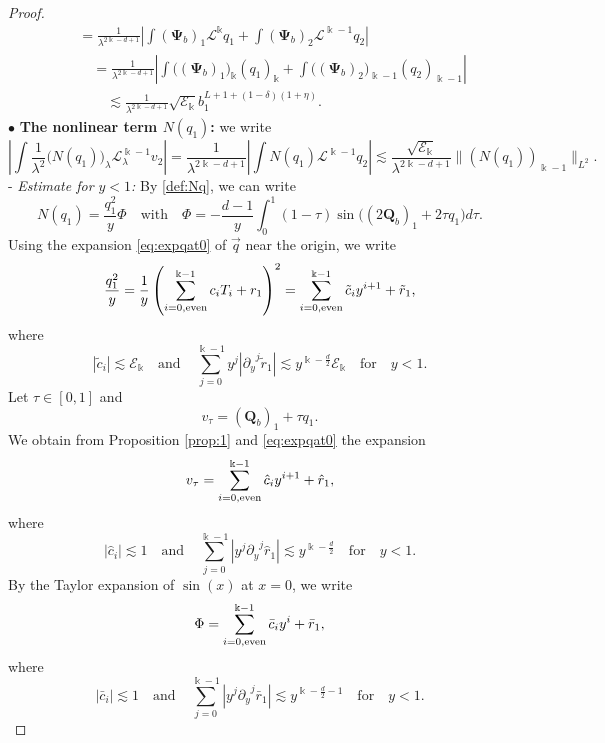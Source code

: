 \documentclass[11pt]{aims}
\theoremstyle{definition}
\numberwithin{equation}{section}
\begin{document}
\begin{proof}
\begin{align}
&\quad = \frac{1}{\lambda^{2\Bbbk - d + 1}}\left|\int(\mathbf{\Psi}_b)_1 {\mathscr{L}}^{\Bbbk}q_1 +\int(\mathbf{\Psi}_b)_2 {\mathscr{L}}^{\Bbbk - 1}q_2  \right|\nonumber\\
& \qquad = \frac{1}{\lambda^{2\Bbbk - d + 1}}\left|\int\big((\mathbf{\Psi}_b)_1\big)_{\Bbbk} (q_1)_\Bbbk +\int\big((\mathbf{\Psi}_b)_2\big)_{\Bbbk - 1} (q_2)_{\Bbbk - 1}\right|\nonumber\\
& \qquad \quad \lesssim \frac{1}{\lambda^{2\Bbbk - d + 1}}\sqrt{{\mathscr{E}}_\Bbbk}b_1^{L + 1 + (1 -\delta)(1 + \eta)}.\label{est:Psi}
\end{align}
$\bullet$ \textbf{The nonlinear term $N(q_1)$:} we write 
\begin{equation}\label{est:Nq1}
\left|\int \frac{1}{\lambda^2}\big(N(q_1)\big)_\lambda{\mathscr{L}}_\lambda^{\Bbbk - 1}v_2\right| = \frac{1}{\lambda^{2\Bbbk - d  +1}}\left|\int N(q_1){\mathscr{L}}^{\Bbbk - 1}q_2\right| \lesssim \frac{\sqrt{{\mathscr{E}}_\Bbbk}}{\lambda^{2\Bbbk -d + 1 }}\|(N(q_1))_{\Bbbk - 1} \|_{L^2}.
\end{equation}
- \textit{Estimate for $y < 1$:} By \eqref{def:Nq}, we can write
$$N(q_1) = \frac{q_1^2}{y}\Phi \quad \text{with} \quad \Phi = -\frac{d-1}{y}\int_0^1(1 - \tau)\sin\big((2\mathbf{Q}_b)_1 + 2\tau q_1\big) d\tau.$$
Using the expansion \eqref{eq:expqat0} of $\vec q$ near the origin, we write
\begin{equation}\label{eq:q1y2}
\frac{q_1^2}{y} = \frac{1}{y} \left(\sum_{i = 0, \textup{even}}^{\Bbbk - 1}c_iT_i + r_1\right)^2 = \sum_{i = 0, \textup{even}}^{\Bbbk - 1}\tilde c_iy^{i + 1} + \tilde r_1,
\end{equation}
where 
$$|\tilde{c}_i| \lesssim {\mathscr{E}}_\Bbbk \quad \text{and} \quad \sum_{j = 0}^{\Bbbk - 1}y^j|{\partial_y}^j \tilde{r}_1| \lesssim y^{\Bbbk - \frac{d}{2}}{\mathscr{E}}_\Bbbk \quad \text{for}\quad  y < 1.$$ 
Let $\tau \in [0,1]$ and 
$$v_\tau = (\mathbf{Q}_b)_1 + \tau q_1.$$
We obtain from Proposition \ref{prop:1} and \eqref{eq:expqat0} the expansion
$$v_\tau = \sum_{i = 0, \textup{even}}^{\Bbbk - 1} \hat c_i y^{i  +1} + \hat r_1,$$
where
$$|\hat c_i| \lesssim 1 \quad \text{and} \quad \sum_{j = 0}^{\Bbbk - 1}|y^j {\partial_y}^j \hat r_1| \lesssim y^{\Bbbk - \frac{d}{2}} \quad \text{for} \quad y < 1.$$
By the Taylor expansion of $\sin(x)$ at $x = 0$, we write
\begin{equation}\label{eq:Phiq}
\Phi = \sum_{i = 0, \textup{even}}^{\Bbbk - 1} \bar c_i y^{i} + \bar r_1,
\end{equation}
where
$$|\bar c_i| \lesssim 1 \quad \text{and} \quad \sum_{j = 0}^{\Bbbk - 1}|y^j {\partial_y}^j \bar r_1| \lesssim y^{\Bbbk - \frac{d}{2} - 1} \quad \text{for} \quad y < 1.$$

\end{proof}
\end{document}
